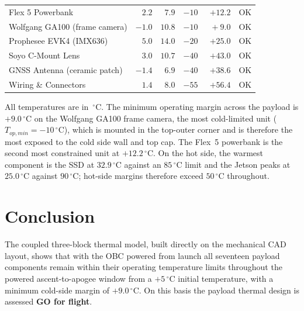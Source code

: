 \documentclass[11pt,a4paper]{article}
\newcommand{\degC}{\,^{\circ}\mathrm{C}}
\begin{document}
\begin{table}[H]
\begin{tabular}{p{5.0cm} r r r r c}
Flex 5 Powerbank               & $\phantom{0}2.2$ & $\phantom{0}7.9$ & $-10$ & $+12.2$ & OK \\
Wolfgang GA100 (frame camera)  & $-1.0$ & $10.8$ & $-10$ & $\phantom{0}+9.0$ & OK \\
Prophesee EVK4 (IMX636)        & $\phantom{0}5.0$ & $14.0$ & $-20$ & $+25.0$ & OK \\
Soyo C-Mount Lens              & $\phantom{0}3.0$ & $10.7$ & $-40$ & $+43.0$ & OK \\
GNSS Antenna (ceramic patch)   & $-1.4$ & $\phantom{0}6.9$ & $-40$ & $+38.6$ & OK \\
Wiring \& Connectors           & $\phantom{0}1.4$ & $\phantom{0}8.0$ & $-55$ & $+56.4$ & OK \\
\bottomrule
\end{tabular}
\end{table}

All temperatures are in $\degC$. The minimum operating margin across the payload is
$+9.0\degC$ on the Wolfgang GA100 frame camera, the most cold-limited unit
($T_{op,min}=-10\degC$), which is mounted in the top-outer corner and is therefore the
most exposed to the cold side wall and top cap. The Flex~5 powerbank is the second most
constrained unit at $+12.2\degC$. On the hot side, the warmest component is the SSD at
$32.9\degC$ against an $85\degC$ limit and the Jetson peaks at $25.0\degC$ against
$90\degC$; hot-side margins therefore exceed $50\degC$ throughout.

\section{Conclusion}
The coupled three-block thermal model, built directly on the mechanical CAD layout,
shows that with the OBC powered from launch all seventeen payload components remain
within their operating temperature limits throughout the powered ascent-to-apogee
window from a $+5\degC$ initial temperature, with a minimum cold-side margin of
$+9.0\degC$. On this basis the payload thermal design is assessed
\textbf{GO for flight}.
\end{document}

